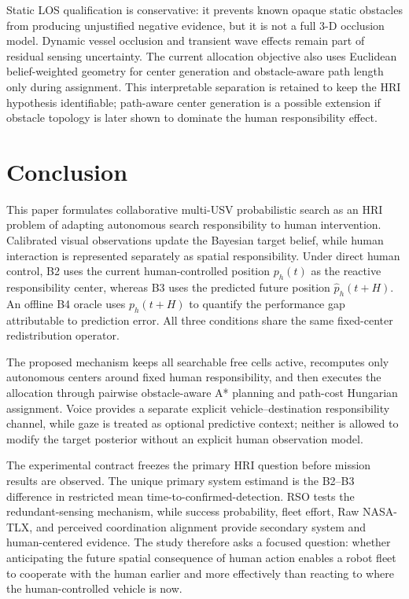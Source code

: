 \documentclass[conference]{IEEEtran}
\begin{document}
Static LOS qualification is conservative: it prevents known opaque static
obstacles from producing unjustified negative evidence, but it is not a full
3-D occlusion model. Dynamic vessel occlusion and transient wave effects remain
part of residual sensing uncertainty. The current allocation objective also
uses Euclidean belief-weighted geometry for center generation and obstacle-aware
path length only during assignment. This interpretable separation is retained
to keep the HRI hypothesis identifiable; path-aware center generation is a
possible extension if obstacle topology is later shown to dominate the human
responsibility effect.

\section{Conclusion}

This paper formulates collaborative multi-USV probabilistic search as an HRI
problem of adapting autonomous search responsibility to human intervention.
Calibrated visual observations update the Bayesian target belief, while human
interaction is represented separately as spatial responsibility. Under direct
human control, B2 uses the current human-controlled position $p_h(t)$ as the
reactive responsibility center, whereas B3 uses the predicted future position
$\hat p_h(t+H)$. An offline B4 oracle uses $p_h(t+H)$ to quantify the
performance gap attributable to prediction error. All three conditions share
the same fixed-center redistribution operator.

The proposed mechanism keeps all searchable free cells active, recomputes only
autonomous centers around fixed human responsibility, and then executes the
allocation through pairwise obstacle-aware A* planning and path-cost Hungarian
assignment. Voice provides a separate explicit vehicle--destination
responsibility channel, while gaze is treated as optional predictive context;
neither is allowed to modify the target posterior without an explicit human
observation model.

The experimental contract freezes the primary HRI question before mission
results are observed. The unique primary system estimand is the B2--B3
difference in restricted mean time-to-confirmed-detection. RSO tests the
redundant-sensing mechanism, while success probability, fleet effort, Raw
NASA-TLX, and perceived coordination alignment provide secondary system and
human-centered evidence. The study therefore asks a focused question: whether
anticipating the future spatial consequence of human action enables a robot
fleet to cooperate with the human earlier and more effectively than reacting to
where the human-controlled vehicle is now.
\end{document}
